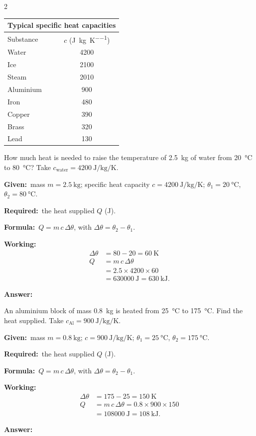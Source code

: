 \documentclass[10pt]{article}
\newcommand{\Given}{\par\vspace{2pt}\textbf{Given:}\ }
\newcommand{\Required}{\par\vspace{2pt}\textbf{Required:}\ }
\newcommand{\Formula}{\par\vspace{2pt}\textbf{Formula:}\ }
\newcommand{\Working}{\par\vspace{2pt}\textbf{Working:}}
\newcommand{\Answer}[1]{\par\vspace{2pt}\textbf{Answer:}\ \fbox{#1}}
\begin{document}
\begin{multicols}{2}
\begin{center}
\small
\begin{tabular}{@{}lc@{}}
\multicolumn{2}{c}{\textbf{Typical specific heat capacities}}\\[2pt]
\hline
Substance & $c$ (\si{\joule\per\kilogram\per\kelvin}) \\
\hline
Water        & 4200 \\
Ice          & 2100 \\
Steam        & 2010 \\
Aluminium    & 900  \\
Iron         & 480  \\
Copper       & 390  \\
Brass        & 320  \\
Lead         & 130  \\
\hline
\end{tabular}
\end{center}

\begin{example}
How much heat is needed to raise the temperature of \SI{2.5}{\kilogram}
of water from \SI{20}{\degreeCelsius} to \SI{80}{\degreeCelsius}?
Take $c_{\text{water}} = \SI{4200}{\joule\per\kilogram\per\kelvin}$.
\tcblower
\Given mass $m = \SI{2.5}{\kilogram}$;
specific heat capacity $c = \SI{4200}{\joule\per\kilogram\per\kelvin}$;
$\theta_1 = \SI{20}{\degreeCelsius}$, $\theta_2 = \SI{80}{\degreeCelsius}$.
\Required the heat supplied $Q$ (\si{\joule}).
\Formula $Q = m\,c\,\Delta\theta$, with $\Delta\theta = \theta_2 - \theta_1$.
\Working
\begin{align*}
  \Delta\theta &= 80 - 20 = \SI{60}{\kelvin} \\
  Q &= m\,c\,\Delta\theta \\
    &= 2.5 \times 4200 \times 60 \\
    &= \SI{630000}{\joule} = \SI{630}{\kilo\joule}.
\end{align*}
\Answer{$Q = \SI{630}{\kilo\joule}$}
\end{example}

\begin{example}
An aluminium block of mass \SI{0.8}{\kilogram} is heated from
\SI{25}{\degreeCelsius} to \SI{175}{\degreeCelsius}. Find the heat
supplied. Take $c_{\text{Al}} =
\SI{900}{\joule\per\kilogram\per\kelvin}$.
\tcblower
\Given mass $m = \SI{0.8}{\kilogram}$;
$c = \SI{900}{\joule\per\kilogram\per\kelvin}$;
$\theta_1 = \SI{25}{\degreeCelsius}$, $\theta_2 = \SI{175}{\degreeCelsius}$.
\Required the heat supplied $Q$ (\si{\joule}).
\Formula $Q = m\,c\,\Delta\theta$, with $\Delta\theta = \theta_2 - \theta_1$.
\Working
\begin{align*}
  \Delta\theta &= 175 - 25 = \SI{150}{\kelvin} \\
  Q &= m\,c\,\Delta\theta = 0.8 \times 900 \times 150 \\
    &= \SI{108000}{\joule} = \SI{108}{\kilo\joule}.
\end{align*}
\Answer{$Q = \SI{108}{\kilo\joule}$}
\end{example}


\end{multicols}
\end{document}
